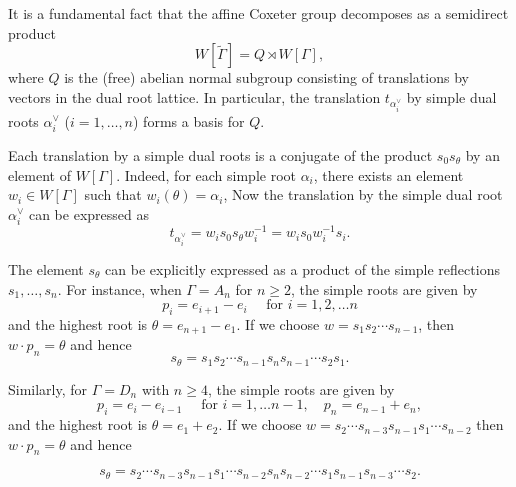 \documentclass[12pt]{amsart}
\theoremstyle{definition}
\numberwithin{equation}{section}
\begin{document}
It is a fundamental fact that the affine Coxeter group decomposes as a semidirect product
$$
W[\tilde{\Gamma}] = Q \rtimes W[\Gamma],
$$
where $Q$ is the (free) abelian normal subgroup consisting of translations by vectors in the dual root lattice. In particular, the translation $t_{\alpha_i^\vee}$ by simple dual roots $\alpha_i^\vee$ ($i=1,\ldots, n$) forms a basis for $Q$.

Each translation by a simple dual roots is a conjugate of the product $s_0s_\theta$ by an element of $W[\Gamma]$. Indeed, for each simple root $\alpha_i$, there exists an element $w_i\in W[\Gamma]$ such that $w_i(\theta)=\alpha_i$, Now the translation by the simple dual root $\alpha_i^\vee$ can be expressed as $$t_{\alpha_i^\vee}=w_i s_0s_\theta w_i^{-1}=w_i s_0w_i^{-1}s_i .$$
\par

The element $s_\theta$ can be explicitly expressed as a product of the simple reflections $s_1, \dots, s_n$. For instance, when $\Gamma =A_n$ for $n\geq 2$, the simple roots are given by 
$$
p_i=e_{i+1}-e_i \quad \text { for } i=1,2,\ldots n
 $$
and the highest root is $\theta=e_{n+1}-e_1$. If we choose $w=s_1 s_2 \cdots s_{n-1}$, then $w\cdot p_n= \theta$ and hence $$s_\theta=s_1 s_2 \cdots s_{n-1} s_n s_{n-1} \cdots s_2 s_1.$$
 
Similarly, for $\Gamma = D_n$ with $n\geq 4$, the simple roots are given by 
$$
p_i=e_i-e_{i-1} \quad  \text { for } i = 1,\ldots n-1, \quad p_n = e_{n-1}+e_n,
$$
and the highest root is $\theta = e_{1} + e_{2}$. If we choose $w=s_{2}\cdots s_{n-3}s_{n-1}s_1\cdots s_{n-2}$ then $w\cdot p_n = \theta$ and hence 

$$ s_\theta=s_{2}\cdots s_{n-3}s_{n-1}s_1\cdots s_{n-2}  s_n s_{n-2}\cdots s_1 s_{n-1}s_{n-3}\cdots s_{2}.$$ 
\end{document}
